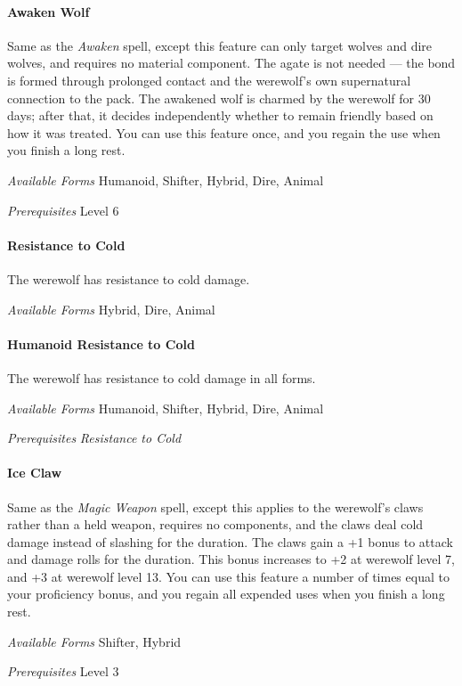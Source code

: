 \documentclass[twocolumn]{dndbook}
\begin{document}
\paragraph*{Awaken Wolf}
Same as the \emph{Awaken} spell, except this feature can only target wolves and dire wolves, and requires no material component.
The agate is not needed --- the bond is formed through prolonged contact and the werewolf's own supernatural connection to the pack.
The awakened wolf is charmed by the werewolf for 30 days; after that, it decides independently whether to remain friendly based on how it was treated.
You can use this feature once, and you regain the use when you finish a long rest.\par
\emph{Available Forms} Humanoid, Shifter, Hybrid, Dire, Animal\par
\emph{Prerequisites} Level 6\par

\paragraph*{Resistance to Cold}
The werewolf has resistance to cold damage.\par
\emph{Available Forms} Hybrid, Dire, Animal\par

\paragraph*{Humanoid Resistance to Cold}
The werewolf has resistance to cold damage in all forms.\par
\emph{Available Forms} Humanoid, Shifter, Hybrid, Dire, Animal\par
\emph{Prerequisites} \emph{Resistance to Cold}\par

\paragraph*{Ice Claw}
Same as the \emph{Magic Weapon} spell, except this applies to the werewolf's claws rather than a held weapon, requires no components, and the claws deal cold damage instead of slashing for the duration.
The claws gain a +1 bonus to attack and damage rolls for the duration.
This bonus increases to +2 at werewolf level 7, and +3 at werewolf level 13.
You can use this feature a number of times equal to your proficiency bonus, and you regain all expended uses when you finish a long rest.\par
\emph{Available Forms} Shifter, Hybrid\par
\emph{Prerequisites} Level 3\par
\end{document}
